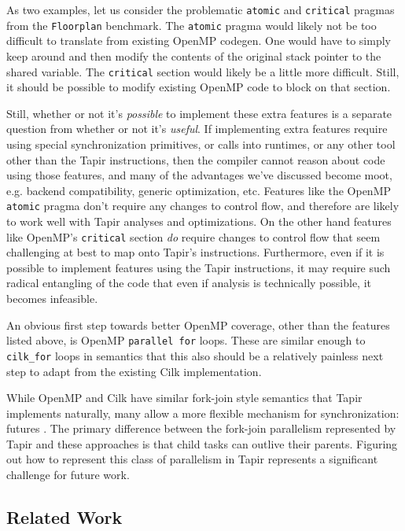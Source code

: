 \documentclass[sigconf]{acmart}
\begin{document}
As two examples, let us consider the problematic \texttt{atomic} and
\texttt{critical} pragmas from the \texttt{Floorplan} benchmark. The 
\texttt{atomic} pragma would likely not be too difficult to translate
from existing OpenMP codegen. One would have to simply keep around and then
modify the contents of the original stack pointer to the shared variable. The
\texttt{critical} section would likely be a little more difficult. Still, it
should be possible to modify existing OpenMP code to block on that section. 

Still, whether or not it's \emph{possible} to implement these extra features
is a separate question from whether or not it's \emph{useful}. If implementing
extra features require using special synchronization primitives, or calls into
runtimes, or any other tool other than the Tapir instructions, then the
compiler cannot reason about code using those features, and many of the
advantages we've discussed become moot, e.g. backend compatibility, generic 
optimization, etc. Features like the OpenMP \texttt{atomic} pragma don't 
require any changes to control flow, and therefore are likely to work well 
with Tapir analyses and optimizations. On the other hand features like OpenMP's
\texttt{critical} section \emph{do} require changes to control flow that seem
challenging at best to map onto Tapir's instructions. Furthermore, even if it
is possible to implement features using the Tapir instructions, it may require 
such radical entangling of the code that even if analysis is technically
possible, it becomes infeasible. 

An obvious first step towards better OpenMP coverage, other than the features
listed above, is OpenMP \texttt{parallel for} loops. These are similar enough
to \texttt{cilk\_for} loops in semantics that this also should be a relatively
painless next step to adapt from the existing Cilk implementation. 

While OpenMP and Cilk have similar fork-join style semantics that Tapir
implements naturally, many allow a more flexible mechanism for synchronization:
futures \cite{qthreads, chapel, hpx}. The primary difference between the
fork-join parallelism represented by Tapir and these approaches is that
child tasks can outlive their parents. Figuring out how to represent this class
of parallelism in Tapir represents a significant challenge for future work.

\subsection{Related Work} \label{Sec:Related}
\end{document}

